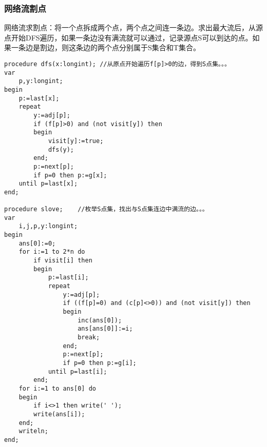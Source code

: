 \subsubsection{网络流割点}
网络流求割点：将一个点拆成两个点，两个点之间连一条边。求出最大流后，从源点开始DFS遍历，如果一条边没有满流就可以通过，记录源点S可以到达的点。如果一条边是割边，则这条边的两个点分别属于S集合和T集合。
\begin{verbatim}
procedure dfs(x:longint); //从原点开始遍历f[p]>0的边，得到S点集。。。
var
    p,y:longint;
begin
    p:=last[x];
    repeat
        y:=adj[p];
        if (f[p]>0) and (not visit[y]) then
        begin
            visit[y]:=true;
            dfs(y);
        end;
        p:=next[p];
        if p=0 then p:=g[x];
    until p=last[x];
end;

procedure slove;    //枚举S点集，找出与S点集连边中满流的边。。。
var
    i,j,p,y:longint;
begin
    ans[0]:=0;
    for i:=1 to 2*n do
        if visit[i] then
        begin
            p:=last[i];
            repeat
                y:=adj[p];
                if ((f[p]=0) and (c[p]<>0)) and (not visit[y]) then
                begin
                    inc(ans[0]);
                    ans[ans[0]]:=i;
                    break;
                end;
                p:=next[p];
                if p=0 then p:=g[i];
            until p=last[i];
        end;
    for i:=1 to ans[0] do
    begin
        if i<>1 then write(' ');
        write(ans[i]);
    end;
    writeln;
end;
\end{verbatim} 
